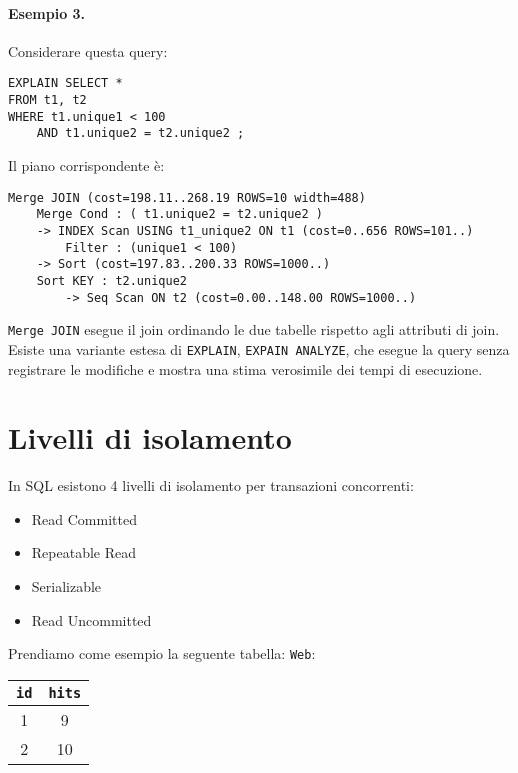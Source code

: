 \documentclass[a4paper, 10pt]{article}
\begin{document}
	\paragraph{Esempio 3.}
		Considerare questa query:
	\begin{lstlisting}
EXPLAIN SELECT *
FROM t1, t2
WHERE t1.unique1 < 100 
	AND t1.unique2 = t2.unique2 ;
	\end{lstlisting}
	Il piano corrispondente è:
	\begin{lstlisting}
Merge JOIN (cost=198.11..268.19 ROWS=10 width=488)
	Merge Cond : ( t1.unique2 = t2.unique2 )
	-> INDEX Scan USING t1_unique2 ON t1 (cost=0..656 ROWS=101..)
		Filter : (unique1 < 100)
	-> Sort (cost=197.83..200.33 ROWS=1000..)
	Sort KEY : t2.unique2
		-> Seq Scan ON t2 (cost=0.00..148.00 ROWS=1000..)
	\end{lstlisting}
	\lstinline|Merge JOIN| esegue il join ordinando le due tabelle rispetto agli attributi di join. \\
	
	Esiste una variante estesa di \lstinline|EXPLAIN|, \lstinline|EXPAIN ANALYZE|, che esegue la query senza registrare le modifiche e mostra una stima verosimile dei tempi di esecuzione.
	
	\section{Livelli di isolamento}
		In SQL esistono 4 livelli di isolamento per transazioni concorrenti:
		\begin{itemize}
			\item Read Committed
			\item Repeatable Read
			\item Serializable
			\item Read Uncommitted
		\end{itemize}
		Prendiamo come esempio la seguente tabella:
		\lstinline|Web|:
		\begin{tabular}{cc}
			\toprule
			\lstinline|id| & \lstinline|hits| \\
			\midrule
			1 & 9 \\
			2 & 10 \\
			\midrule
		\end{tabular}
		
\end{document}
